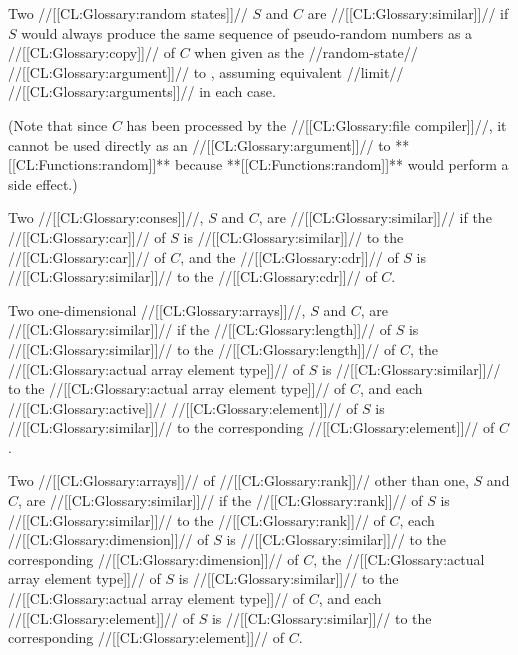  
Two //[[CL:Glossary:random states]]// $S$ and $C$ are //[[CL:Glossary:similar]]// if $S$
would always produce the same sequence of pseudo-random numbers 
as a //[[CL:Glossary:copy]]// of $C$
when given as the //random-state// //[[CL:Glossary:argument]]// to , 
assuming equivalent //limit// //[[CL:Glossary:arguments]]// in each case.

(Note that since $C$ has been processed by the //[[CL:Glossary:file compiler]]//,
it cannot be used directly as an //[[CL:Glossary:argument]]// to **[[CL:Functions:random]]**
because **[[CL:Functions:random]]** would perform a side effect.)


Two //[[CL:Glossary:conses]]//, $S$ and $C$, are //[[CL:Glossary:similar]]// if
    the //[[CL:Glossary:car]]// of $S$ is //[[CL:Glossary:similar]]// to the //[[CL:Glossary:car]]// of $C$,
and the //[[CL:Glossary:cdr]]// of $S$ is //[[CL:Glossary:similar]]// to the //[[CL:Glossary:cdr]]// of $C$.


Two one-dimensional //[[CL:Glossary:arrays]]//, $S$ and $C$, are //[[CL:Glossary:similar]]// if
     the //[[CL:Glossary:length]]// of $S$ is //[[CL:Glossary:similar]]// to the //[[CL:Glossary:length]]// of $C$,
     the //[[CL:Glossary:actual array element type]]// of $S$ is //[[CL:Glossary:similar]]// to
     the //[[CL:Glossary:actual array element type]]// of $C$,
 and each //[[CL:Glossary:active]]// //[[CL:Glossary:element]]// of $S$ is //[[CL:Glossary:similar]]// to
      the corresponding //[[CL:Glossary:element]]// of $C$.

Two //[[CL:Glossary:arrays]]// of //[[CL:Glossary:rank]]// other than one, $S$ and $C$, are //[[CL:Glossary:similar]]// if
     the //[[CL:Glossary:rank]]// of $S$ is //[[CL:Glossary:similar]]// to the //[[CL:Glossary:rank]]// of $C$,
     each //[[CL:Glossary:dimension]]// of $S$ is //[[CL:Glossary:similar]]// to 
      the corresponding //[[CL:Glossary:dimension]]// of $C$,
     the //[[CL:Glossary:actual array element type]]// of $S$ is //[[CL:Glossary:similar]]// to
     the //[[CL:Glossary:actual array element type]]// of $C$,
 and each //[[CL:Glossary:element]]// of $S$ is //[[CL:Glossary:similar]]// to
      the corresponding //[[CL:Glossary:element]]// of $C$.

